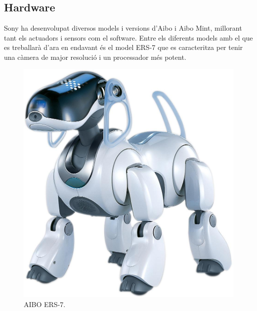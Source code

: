 \documentclass[12pt,a4paper,final,twoside]{article}
\begin{document}
\subsection{Hardware}
Sony ha desenvolupat diversos models i versions d'Aibo i Aibo Mint, millorant tant els actuadors i sensors com el software.
Entre els diferents models amb el que es treballarà d'ara en endavant és el model ERS-7 que es caracteritza per tenir una càmera de major resolució i un processador més potent.
\begin{figure}[h!]
	\centering
    \includegraphics[scale=0.1]	{images/ers7lrg}
	 \caption{AIBO ERS-7.}
  \label{fig:ers7}
\end{figure}	
 
\end{document}
